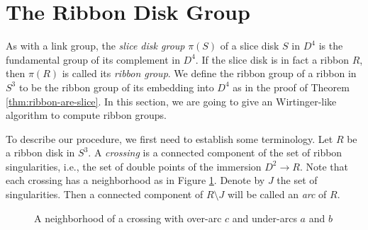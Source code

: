 \documentclass{article}
\theoremstyle{definition}
\begin{document}
\section{The Ribbon Disk Group}


As with a link group, the \textit{slice disk group} $\pi(S)$ of a slice disk $S$ in $D^4$ is the fundamental group of its complement in $D^4$. If the slice disk is in fact a ribbon $R$, then $\pi(R)$ is called its \textit{ribbon group}. We define the ribbon group of a ribbon in $S^3$ to be the ribbon group of its embedding into $D^4$ as in the proof of Theorem \ref{thm:ribbon-are-slice}. In this section, we are going to give an Wirtinger-like algorithm to compute ribbon groups.

To describe our procedure, we first need to establish some terminology. Let $R$ be a ribbon disk in $S^3$. A \textit{crossing} is a connected component of the set of ribbon singularities, i.e., the set of double points of the immersion $D^2 \rightarrow R$. Note that each crossing has a neighborhood as in Figure \ref{fig:nbhd-of-crossing-ribbon}. Denote by $J$ the set of singularities. Then a connected component of $R \setminus J$ will be called an \textit{arc} of $R$.

\begin{figure}[htb]
\centering
{}
\caption{A neighborhood of a crossing with over-arc $c$ and under-arcs $a$ and $b$}
\label{fig:nbhd-of-crossing-ribbon}
\end{figure}
\end{document}
